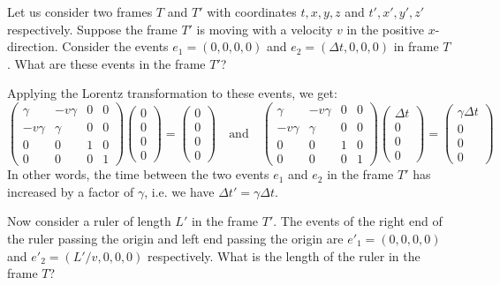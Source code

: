 \documentclass{../../templates/lkx_pset}
\begin{document}
\begin{problem}{1}
Let us consider two frames $T$ and $T'$ with coordinates $t,x,y,z$ and $t',x',y',z'$ respectively. Suppose the frame $T'$ is moving with a velocity $v$ in the positive $x$-direction.
Consider the events $e_1 = (0,0,0,0)$ and $e_2 = (\Delta t, 0, 0, 0)$ in frame $T$. What are these events in the frame $T'$?
\end{problem}

\begin{solution}
	Applying the Lorentz transformation to these events, we get:
	\[
		\begin{pmatrix}
			\gamma   & -v\gamma & 0 & 0 \\
			-v\gamma & \gamma   & 0 & 0 \\
			0        & 0        & 1 & 0 \\
			0        & 0        & 0 & 1
		\end{pmatrix}\begin{pmatrix}0\\0\\0\\0\end{pmatrix}
		= \begin{pmatrix}0\\0\\0\\0\end{pmatrix}\quad\textrm{and}\quad
		\begin{pmatrix}
			\gamma   & -v\gamma & 0 & 0 \\
			-v\gamma & \gamma   & 0 & 0 \\
			0        & 0        & 1 & 0 \\
			0        & 0        & 0 & 1
		\end{pmatrix}\begin{pmatrix}\Delta t\\0\\0\\0\end{pmatrix}
		= \begin{pmatrix}\gamma \Delta t\\0\\0\\0\end{pmatrix}
	\]
	In other words, the time between the two events $e_1$ and $e_2$ in the frame $T'$ has increased by a factor of $\gamma$, i.e. we have $\Delta t' = \gamma \Delta t$.
\end{solution}

\begin{problem}{2}
Now consider a ruler of length $L'$ in the frame $T'$. The events of the right end of the ruler passing the origin and left end passing the origin are $e'_1 = (0,0,0,0)$ and $e'_2 = (L'/v, 0, 0, 0)$ respectively. What is the length of the ruler in the frame $T$?
\end{problem}
\end{document}
